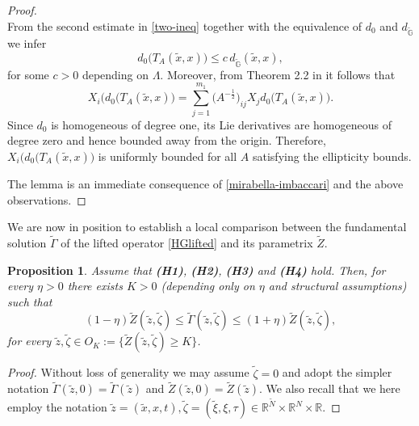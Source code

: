 \documentclass[11pt,a4paper]{article}
\newtheorem{proposition}[theorem]{\bf Proposition}
\numberwithin{equation}{section}
\newcommand{\R}{\mathbb{R}}
\def \rn {{\mathbb {R}}^{N}}
\def \tt {\tilde}
\def \GG {{\mathbb{G}}}
\def \ti {\times}
\def \G {{\Gamma}}
\def \y {{\eta}}
\def \z {{\zeta}}
\begin{document}
{{\begin{proof}
\begin{equation}
	\end{equation}
	From the second estimate in \eqref{two-ineq} together with the equivalence of $ d_0$ and $d_{\tt\GG}$ we infer
	\begin{equation}\label{kamarina}
		d_0 \big(T_{A}(\tt x,x)\big)\leq c\, d_{\tt\GG} (\tt x,x),
	\end{equation} 
	for some $c>0$ depending on $\Lambda$. Moreover, from Theorem 2.2 in \cite{bonfiglioli2004families} it follows that
	\begin{equation}
		 X_i  \Big(d_0 \big(T_{A}(\tt x,x)\Big)=\sum_{j=1}^{m_1} \Big(A^{-\frac{1}{2}}\Big)_{ij}X_jd_0\big(T_{A}(\tt x,x)\big).
	\end{equation}
	Since ${d_0}$ is homogeneous of degree one, its Lie derivatives are homogeneous of degree zero and hence bounded away from the origin. Therefore,  $X_i  \Big(d_0 \big(T_{A}(\tt x,x)\Big)$ is uniformly bounded for all $A$ satisfying the ellipticity bounds. 
	
	The lemma is an immediate consequence of \eqref{mirabella-imbaccari} and the above observations.
\end{proof}
We are now in position to establish a local comparison between the fundamental solution $\tt\G$ of the lifted operator \eqref{HGlifted} and its parametrix $\tt Z$. 
\begin{proposition}\label{Prop-closetoparametrix}
	Assume that \textbf{(H1)}, \textbf{(H2)}, \textbf{(H3)} and \textbf{(H4)} hold. Then, for every $\y>0$ there exists $K>0$ (depending only on $\y$ and structural assumptions) such that 
	\begin{equation}\label{close-to-parametrix}
		(1-\y)\tt Z(\tt z,\tt \z)\leq \tt\G(\tt z,\tt \z)\leq (1+\y)\tt Z(\tt z,\tt \z),
	\end{equation}
	for every $\tt z,\tt \z\in O_K:=\Big\{\tt Z(\tt z,\tt \z)\geq K\Big\}$.
\end{proposition}
\begin{proof}
	Without loss of generality we may assume $\tt \z =0$ and adopt the simpler notation $\tilde{\G}(\tilde{z},0)=\tilde{\G}(\tilde{z})$ and $\tilde{Z}(\tilde{z},0)=\tilde{Z}(\tilde{z})$. We also recall that we here employ the notation $\tilde{z}=(\tilde{x},x,t), \tt \z=(\tt \xi,\xi,\tau) \in \R^{\tt N}\ti \rn \ti \R$. 
	

\end{proof}}}
\end{document}
